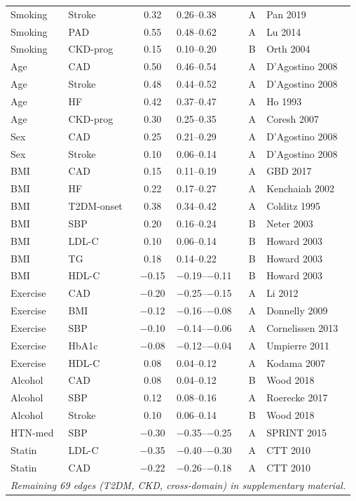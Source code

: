 \documentclass[runningheads]{llncs}
\begin{document}
{\begin{longtable}{@{}p{2.0cm}p{2.0cm}cp{1.4cm}cp{2.8cm}@{}}
Smoking & Stroke & 0.32 & 0.26--0.38 & A & Pan 2019 \\
Smoking & PAD & 0.55 & 0.48--0.62 & A & Lu 2014 \\
Smoking & CKD-prog & 0.15 & 0.10--0.20 & B & Orth 2004 \\
Age & CAD & 0.50 & 0.46--0.54 & A & D'Agostino 2008 \\
Age & Stroke & 0.48 & 0.44--0.52 & A & D'Agostino 2008 \\
Age & HF & 0.42 & 0.37--0.47 & A & Ho 1993 \\
Age & CKD-prog & 0.30 & 0.25--0.35 & A & Coresh 2007 \\
Sex & CAD & 0.25 & 0.21--0.29 & A & D'Agostino 2008 \\
Sex & Stroke & 0.10 & 0.06--0.14 & A & D'Agostino 2008 \\
BMI & CAD & 0.15 & 0.11--0.19 & A & GBD 2017 \\
BMI & HF & 0.22 & 0.17--0.27 & A & Kenchaiah 2002 \\
BMI & T2DM-onset & 0.38 & 0.34--0.42 & A & Colditz 1995 \\
BMI & SBP & 0.20 & 0.16--0.24 & B & Neter 2003 \\
BMI & LDL-C & 0.10 & 0.06--0.14 & B & Howard 2003 \\
BMI & TG & 0.18 & 0.14--0.22 & B & Howard 2003 \\
BMI & HDL-C & $-$0.15 & $-$0.19--$-$0.11 & B & Howard 2003 \\
Exercise & CAD & $-$0.20 & $-$0.25--$-$0.15 & A & Li 2012 \\
Exercise & BMI & $-$0.12 & $-$0.16--$-$0.08 & A & Donnelly 2009 \\
Exercise & SBP & $-$0.10 & $-$0.14--$-$0.06 & A & Cornelissen 2013 \\
Exercise & HbA1c & $-$0.08 & $-$0.12--$-$0.04 & A & Umpierre 2011 \\
Exercise & HDL-C & 0.08 & 0.04--0.12 & A & Kodama 2007 \\
Alcohol & CAD & 0.08 & 0.04--0.12 & B & Wood 2018 \\
Alcohol & SBP & 0.12 & 0.08--0.16 & A & Roerecke 2017 \\
Alcohol & Stroke & 0.10 & 0.06--0.14 & B & Wood 2018 \\
HTN-med & SBP & $-$0.30 & $-$0.35--$-$0.25 & A & SPRINT 2015 \\
Statin & LDL-C & $-$0.35 & $-$0.40--$-$0.30 & A & CTT 2010 \\
Statin & CAD & $-$0.22 & $-$0.26--$-$0.18 & A & CTT 2010 \\
\midrule
\multicolumn{6}{c}{\small\itshape Remaining 69 edges (T2DM, CKD, cross-domain) in supplementary material.} \\
\end{longtable}
}
\end{document}
